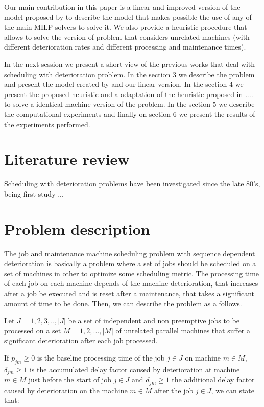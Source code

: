 \documentclass[a4paper,11pt]{article}
\begin{document}
 Our main contribution in this paper is a linear and improved version of the model proposed by \citep{ruiz2017makespan} to describe the model that makes possible the use of any of the main MILP solvers to solve it. We also provide a heuristic procedure that allows to solve the version of problem that considers unrelated machines (with different deterioration rates and different processing and maintenance times).
 
 In the next session we present a short view of the previous works that deal with scheduling with deterioration problem. In the section 3 we describe the problem and present the model created by \citep{ruiz2017makespan} and our linear version. In the section 4 we present the proposed heuristic and a adaptation of the heuristic proposed in .... to solve a identical machine version of the problem. In the section 5 we describe the computational experiments and finally on section 6 we present the results of the experiments performed.  
 
\section{Literature review}

 Scheduling with deterioration problems have been investigated since the late 80's, being first study ...
 
 
\section{Problem description}

The job and maintenance machine scheduling problem with sequence dependent deterioration is basically a problem where a set of jobs should be scheduled on a set of machines in other to optimize some scheduling metric. The processing time of each job on each machine depends of the machine deterioration, that increases after a job be executed and is reset after a maintenance, that takes a significant amount of time to be done. Then, we can describe the problem as a follows. 

Let $J={1, 2, 3,..,|J|}$ be a set of independent and non preemptive jobs to be processed on a set $M = {1, 2, ..., |M|}$ of unrelated parallel machines that suffer a significant deterioration after each job processed.

If $p_{jm} \geq 0 $ is the baseline processing time of the job $j \in J$ on machine $m \in M$, $\delta_{jm} \geq 1$ is the accumulated delay factor caused by deterioration at machine $m \in M$ just before the start of job $j \in J$ and $d_{jm} \geq 1$ the additional delay factor caused by deterioration on the machine $m \in M$ after the job $j \in J$, we can state that:
\end{document}
